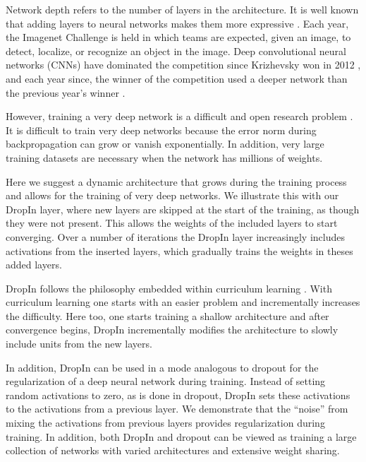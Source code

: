 \documentclass[10pt,twocolumn,letterpaper]{article}
\newcommand{\dropin}{DropIn }
\begin{document}
Network depth refers to the number of layers in the architecture. 
It is well known that adding layers to neural networks makes them more expressive \cite{montufar2014number}. 
Each year, the Imagenet Challenge \cite{Imagenet15} is held in which teams are expected, given an image, to detect, localize, or recognize an object in the image. 
Deep convolutional neural networks (CNNs) have dominated the competition since Krizhevsky \etal won in 2012 \cite{Alexnet12}, and each year since, the winner of the competition used a deeper network than the previous year's winner \cite{Imagenet15, simonyan2014very, szegedy2014going}.

However, training a very deep network is a difficult and open research problem \cite{erhan2009difficulty, glorot2010understanding, srivastava2015training}. 
It is difficult to train very deep networks because the error norm during backpropagation can grow or vanish exponentially.
In addition, very large training datasets are necessary when the network has millions of weights.

Here we suggest a dynamic architecture that grows during the training process and allows for the training of very deep networks.
We illustrate this with our \dropin layer, where new layers are skipped at the start of the training, as though they were not present.
This allows the weights of the included layers to start converging.
Over a number of iterations the \dropin layer increasingly includes activations from the inserted layers, which gradually trains the weights in theses added layers. 

\dropin follows the philosophy embedded within curriculum learning \cite{bengio2009curriculum}.
With curriculum learning one starts with an easier problem and incrementally increases the difficulty.
Here too, one starts training a shallow architecture and after convergence begins, \dropin incrementally modifies the architecture to slowly include units from the new layers.

In addition, \dropin can be used in a mode analogous to dropout \cite{srivastava2014dropout} for the regularization of a deep neural network during training.  
Instead of setting random activations to zero, as is done in dropout, \dropin sets these activations to the activations from a previous layer.
We demonstrate that the ``noise'' from mixing the activations from previous layers provides regularization during training. 
In addition, both \dropin and dropout can be viewed as training a large collection of networks with varied architectures and extensive weight sharing.
\end{document}
